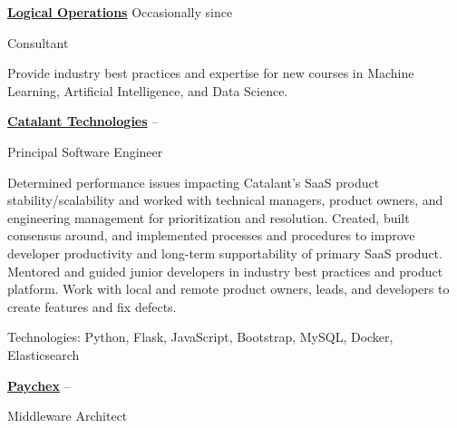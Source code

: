 \documentclass[letterpaper,MMMMyyyy,nonstopmode]{simpleresumecv}
\newif\ifLOCATION
\begin{document}
\begin{Body}
\BigGap
\BigGap

\Entry
\href{http://logicalopertions.com/}
{\textbf{Logical Operations}}
\hfill
Occasionally since 

Consultant
\ifLOCATION
\hfill 
Rochester, New York
\fi

\begin{Detail}
\BulletItem
Provide industry best practices and expertise for new courses in Machine Learning, Artificial Intelligence, and Data Science.
\end{Detail}

\BigGap

\Entry
\href{http://www.gocatalant.com}
{\textbf{Catalant Technologies}}
\hfill
{} -- 

Principal Software Engineer
\ifLOCATION
\hfill
Rochester, New York
\fi

\begin{Detail}
\BulletItem
Determined performance issues impacting Catalant's SaaS product stability/scalability and worked with technical managers, product owners, and engineering management for prioritization and resolution.
\BulletItem
Created, built consensus around, and implemented processes and procedures to improve developer productivity and long-term supportability of primary SaaS product. 
\BulletItem
Mentored and guided junior developers in industry best practices and product platform.
\BulletItem
Work with local and remote product owners, leads, and developers to create features and fix defects.


\Gap
Technologies: Python, Flask, JavaScript, Bootstrap, MySQL, Docker, Elasticsearch

\end{Detail}

\BigGap

\Entry
\href{http://www.paychex.com}
{\textbf{Paychex}}
\hfill
{} -- 

Middleware Architect %
\ifLOCATION
\hfill
Rochester, New York
\fi

\begin{Detail}
\iffalse
At Paychex I worked with cross-functional teams to build: an inventory system to track hosts, managed VMs, databases, and middleware appliances; machine learning systems to efficiently repack databases and to predict system utilization based on user metrics; a ground-up implementation of the Netflix Chaos Monkey; implemented AppDynamics on over 20,000 JVMs; and a system to collect and monitor JVM metrics and send alerts via SNMP and SMTP.
\fi


\end{Detail}
\end{Body}
\end{document}
